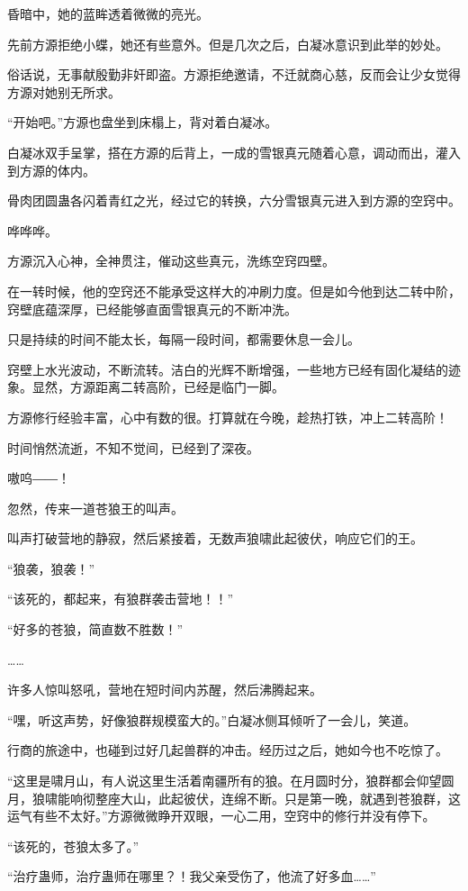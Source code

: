 \begin{this_body}
昏暗中，她的蓝眸透着微微的亮光。

先前方源拒绝小蝶，她还有些意外。但是几次之后，白凝冰意识到此举的妙处。

俗话说，无事献殷勤非奸即盗。方源拒绝邀请，不迁就商心慈，反而会让少女觉得方源对她别无所求。

“开始吧。”方源也盘坐到床榻上，背对着白凝冰。

白凝冰双手呈掌，搭在方源的后背上，一成的雪银真元随着心意，调动而出，灌入到方源的体内。

骨肉团圆蛊各闪着青红之光，经过它的转换，六分雪银真元进入到方源的空窍中。

哗哗哗。

方源沉入心神，全神贯注，催动这些真元，洗练空窍四壁。

在一转时候，他的空窍还不能承受这样大的冲刷力度。但是如今他到达二转中阶，窍壁底蕴深厚，已经能够直面雪银真元的不断冲洗。

只是持续的时间不能太长，每隔一段时间，都需要休息一会儿。

窍壁上水光波动，不断流转。洁白的光辉不断增强，一些地方已经有固化凝结的迹象。显然，方源距离二转高阶，已经是临门一脚。

方源修行经验丰富，心中有数的很。打算就在今晚，趁热打铁，冲上二转高阶！

时间悄然流逝，不知不觉间，已经到了深夜。

嗷呜――！

忽然，传来一道苍狼王的叫声。

叫声打破营地的静寂，然后紧接着，无数声狼啸此起彼伏，响应它们的王。

“狼袭，狼袭！”

“该死的，都起来，有狼群袭击营地！！”

“好多的苍狼，简直数不胜数！”

……

许多人惊叫怒吼，营地在短时间内苏醒，然后沸腾起来。

“嘿，听这声势，好像狼群规模蛮大的。”白凝冰侧耳倾听了一会儿，笑道。

行商的旅途中，也碰到过好几起兽群的冲击。经历过之后，她如今也不吃惊了。

“这里是啸月山，有人说这里生活着南疆所有的狼。在月圆时分，狼群都会仰望圆月，狼啸能响彻整座大山，此起彼伏，连绵不断。只是第一晚，就遇到苍狼群，这运气有些不太好。”方源微微睁开双眼，一心二用，空窍中的修行并没有停下。

“该死的，苍狼太多了。”

“治疗蛊师，治疗蛊师在哪里？！我父亲受伤了，他流了好多血……”


\end{this_body}
